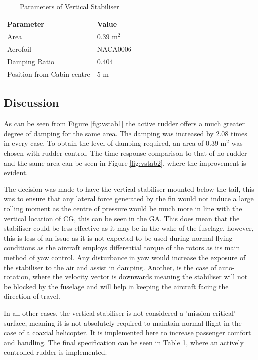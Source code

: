 \documentclass[11pt,a4paper]{article}
\begin{document}
\begin{table}[H]
\centering 
    \caption{Parameters of Vertical Stabiliser}
\begin{tabular}{ll}
\hline
  \rowcolor[HTML]{DAE8FC} 
  Parameter & Value  \\ \hline
   Area  & 0.39 m$^2$\\
   Aerofoil & NACA0006\\
   Damping Ratio & 0.404\\
   Position from Cabin centre & 5 m\\
   \hline
\end{tabular}{}
    \label{tab:vstab}
\end{table}{}

\subsection{Discussion}
 As can be seen from Figure \ref{fig:vstab1} the active rudder offers a much greater degree of damping for the same area. The damping was increased by 2.08 times in every case. To obtain the level of damping required, an area of 0.39 m$^2$ was chosen with rudder control. The time response comparison to that of no rudder and the same area can be seen in Figure \ref{fig:vstab2}, where the improvement is evident.

The decision was made to have the vertical stabiliser mounted below the tail, this was to ensure that any lateral force generated by the fin would not induce a large rolling moment as the centre of pressure would be much more in line with the vertical location of CG, this can be seen in the GA. This does mean that the stabiliser could be less effective as it may be in the wake of the fuselage, however, this is less of an issue as it is not expected to be used during normal flying conditions as the aircraft employs differential torque of the rotors as its main method of yaw control. Any disturbance in yaw would increase the exposure of the stabiliser to the air and assist in damping. Another, is the case of auto-rotation, where the velocity vector is downwards meaning the stabiliser will not be blocked by the fuselage and will help in keeping the aircraft facing the direction of travel.

In all other cases, the vertical stabiliser is not considered a 'mission critical' surface, meaning it is not absolutely required to maintain normal flight in the case of a coaxial helicopter. It is implemented here to increase passenger comfort and handling. The final specification can be seen in Table \ref{tab:vstab}, where an actively controlled rudder is implemented.
\end{document}
